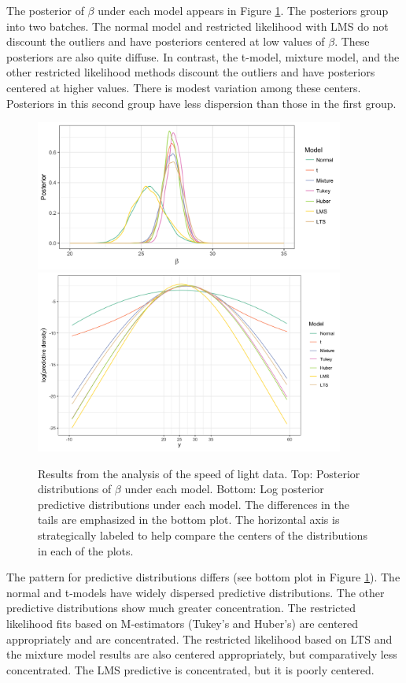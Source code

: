 \documentclass[ba]{imsart}
\begin{document}
The posterior of $\beta$ under each model appears in Figure \ref{fig:newcomb_post}.  The posteriors group into two batches.  The normal model and restricted likelihood with LMS do not discount the outliers and have posteriors centered at low values of $\beta$.  These posteriors are also quite diffuse.  In contrast, the t-model, mixture model, and the other restricted likelihood methods discount the outliers and have posteriors centered at higher values.  There is modest variation among these centers.  Posteriors in this second group have less dispersion than those in the first group.   
\begin{figure}[t]
\centering
{\includegraphics[width = 4in]{speed_of_light_beta.png}}
{\includegraphics[width = 4in]{speed_of_light_predictive.png}}
\caption{Results from the analysis of the speed of light data. Top: Posterior distributions of $\beta$ under each model. Bottom: Log posterior predictive distributions under each model. The differences in the tails are emphasized in the bottom plot. The horizontal axis is strategically labeled to help compare the centers of the distributions in each of the plots.}
\label{fig:newcomb_post}
\end{figure}
The pattern for predictive distributions differs (see bottom plot in Figure \ref{fig:newcomb_post}).  The normal and t-models have widely dispersed predictive distributions.  The other predictive distributions show much greater concentration.  The restricted likelihood fits based on M-estimators (Tukey's and Huber's) are centered appropriately and are concentrated. The restricted likelihood based on LTS and the mixture model results are also centered appropriately, but comparatively less concentrated. The LMS predictive is concentrated, but it is poorly centered.  
\end{document}
